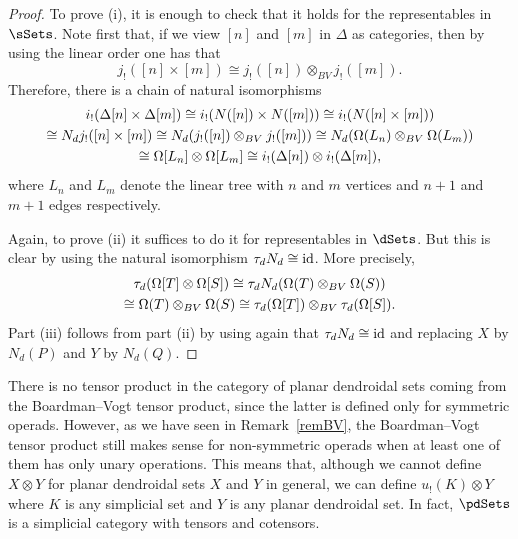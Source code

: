 \begin{proof}
To prove (i), it is enough to check that it holds for the representables in~$\sSets$. Note first that, if we view $[n]$ and $[m]$ in $\Delta$ as categories, then by using the linear order one has that
$$
j_!([n]\times [m])\cong j_!([n])\otimes_{BV} j_!([m]).
$$
Therefore, there is a chain of natural isomorphisms
\begin{multline}\notag
 i_!(\Delta[n]\times \Delta[m])\cong i_!(N([n])\times N([m]))\cong i_!(N([n]\times [m])) \\ \notag
\cong N_d j_!([n]\times [m]) \cong N_d(j_!([n])\otimes_{BV} j_!([m]))\cong N_d(\Omega(L_n)\otimes_{BV}\Omega(L_m))\\ \notag
\cong \Omega[L_n]\otimes \Omega[L_m] \cong i_!(\Delta[n])\otimes i_!(\Delta[m]),
\end{multline}
where $L_n$ and $L_m$ denote the linear tree with $n$ and $m$ vertices and $n+1$ and $m+1$ edges respectively.

Again, to prove (ii) it suffices to do it for representables in $\dSets$. But this is clear by using the natural isomorphism $\tau_d N_d \cong {\rm id}$. More precisely,
\begin{multline}
\tau_d(\Omega[T]\otimes \Omega[S])\cong \tau_d N_d(\Omega(T)\otimes_{BV}\Omega(S)) \\ \notag
\cong \Omega(T)\otimes_{BV} \Omega(S)\cong \tau_d(\Omega[T])\otimes_{BV}\tau_d(\Omega[S]).
\end{multline}
Part (iii) follows from part (ii) by using again that $\tau_d N_d \cong {\rm id}$ and replacing $X$ by $N_d(P)$ and $Y$ by $N_d(Q)$.
\end{proof}

\begin{rem}
There is no tensor product in the category of planar dendroidal sets coming from the Boardman--Vogt tensor product,
since the latter is defined only for symmetric operads. However, as we have seen in Remark~\ref{remBV}, the
Boardman--Vogt tensor product still makes sense for non-symmetric operads when at least one of them has only unary operations. This means that, although we cannot define $X\otimes Y$ for planar dendroidal sets $X$ and $Y$ in general, we can define $u_!(K)\otimes Y$ where $K$ is any simplicial set and $Y$ is any planar dendroidal set. In fact, $\pdSets$ is a simplicial category with tensors and cotensors.
\label{tensornonsym}
\end{rem}


